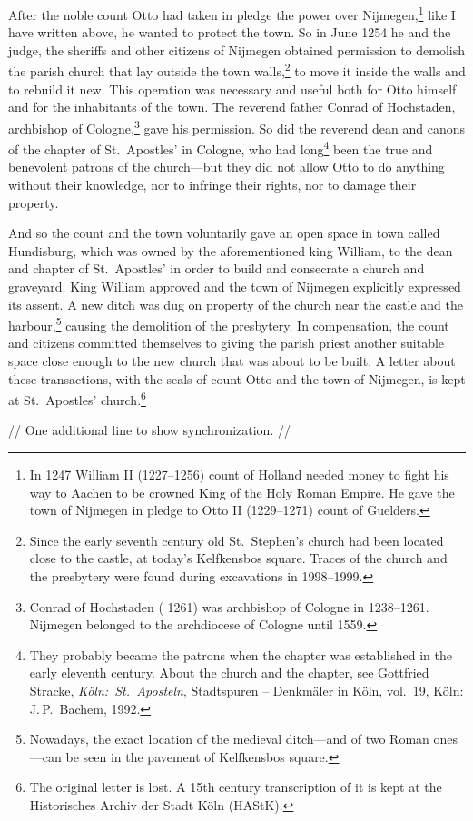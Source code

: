 \documentclass[10pt, letterpaper, twoside]{article}
\begin{document}
\begin{pages}
\begin{Rightside}
\noindent{}%
After the noble count Otto had taken in pledge the power over
Nijmegen,\footnote{In 1247 William II\protect{}
(1227--1256) count of Holland needed money to fight his way to
Aachen\protect{} to be crowned King of the Holy Roman
Empire. He gave the town of Nijmegen in pledge to Otto
II\protect{} (1229--1271) count of Guelders.}
like I have written above, he wanted to protect the town. So in June
1254 he and the judge, the sheriffs and other
citizens of Nijmegen obtained permission to demolish the parish
church that lay outside the town walls,\footnote{Since the early
seventh century old St.\ Stephen's church had been located close
to the castle, at today's
Kelfkensbos\protect{} square.
Traces of the church and the presbytery were found during excavations
in 1998--1999.} to move it inside the walls and to rebuild it new.
This operation was necessary and useful both for Otto himself and
for the inhabitants of the town. The reverend father Conrad of
Hochstaden, archbishop of
Cologne,\footnote{Conrad of Hochstaden ({\textdagger} 1261) was
archbishop of Cologne in 1238--1261. Nijmegen belonged to the
archdiocese of Cologne until 1559.} gave his permission. So did the
reverend dean and canons of the chapter of St.\
Apostles'\protect{} in Cologne, who had
long\footnote{They probably became the patrons when the chapter was
established in the early eleventh century. About the church and the
chapter, see Gottfried Stracke\protect\index{Stracke, G.},
\textit{K\"{o}ln:\ St.\ Aposteln}, Stadtspuren -- Denkm\"{a}ler in
K\"{o}ln, vol.\ 19, K\"{o}ln: J.\,P.\ Bachem, 1992.} been the true
and benevolent patrons of the church---but they did not allow Otto
to do anything without their knowledge, nor to infringe their rights,
nor to damage their property.
\pend

\pstart
And so the count and the town voluntarily gave an open space in town
called Hundisburg, which was owned by the aforementioned king William,
to the dean and chapter of St.\ Apostles' in order to build and
consecrate a church and graveyard. King William approved and the
town of Nijmegen explicitly expressed its assent. A new ditch was dug
on property of the church near the castle and the
harbour,\footnote{Nowadays, the exact location of the medieval
ditch---and of two Roman ones---can be seen in the pavement of
Kelfkensbos\protect{} square.} causing
the demolition of the presbytery. In compensation, the count and
citizens committed themselves to giving the parish priest another
suitable space close enough to the new church that was about to be
built. A letter about these transactions, with the seals of count
Otto and the town of Nijmegen, is kept at St.\ Apostles'
church.\footnote{The original letter is lost. A 15th century
transcription of it is kept at the Historisches Archiv der
Stadt K\"{o}ln (HAStK).}
\pend

\pstart
// One additional line to show synchronization. //
\pend
\endnumbering
\end{Rightside}
\Pages
\end{pages}

\printindex
\end{document}
